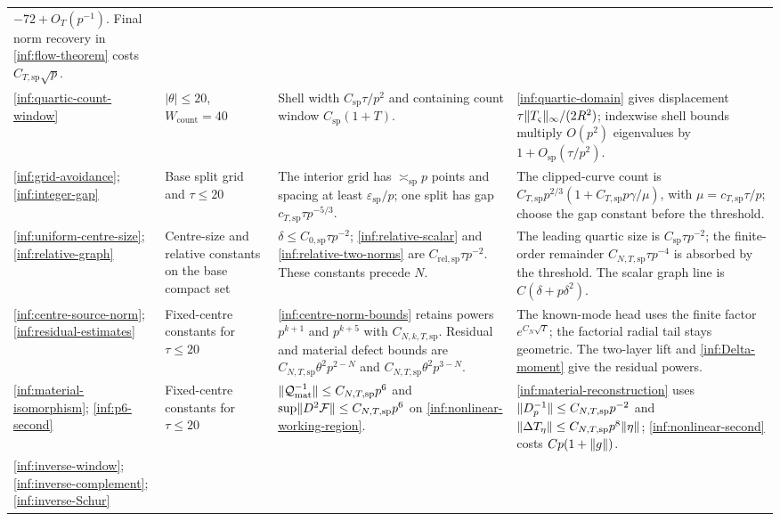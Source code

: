 \begin{lemma}
\begin{longtable}{@{}>{\raggedright\arraybackslash}p{}>{\raggedright\arraybackslash}p{}>{\raggedright\arraybackslash}p{}>{\raggedright\arraybackslash}p{}@{}}
$-72+O_T(p^{-1})$. Final norm recovery in
\ref{inf:flow-theorem} costs $C_{T,\mathrm{sp}}\sqrt p$.\\
\ref{inf:quartic-count-window}
& $|\theta|\le20$, $W_{\mathrm{count}}=40$
& Shell width $C_{\mathrm{sp}}\tau/p^2$ and containing
count window $C_{\mathrm{sp}}(1+T)$.
& \eqref{inf:quartic-domain} gives displacement
$\tau\lVert T_\varsigma\rVert_\infty/(2R^2)$;
indexwise shell bounds multiply $O(p^2)$ eigenvalues by
$1+O_{\mathrm{sp}}(\tau/p^2)$.\\
\ref{inf:grid-avoidance};
\ref{inf:integer-gap}
& Base split grid and $\tau\le20$
& The interior grid has $\asymp_{\mathrm{sp}}p$ points and spacing
at least $\varepsilon_{\mathrm{sp}}/p$; one split has gap
$c_{T,\mathrm{sp}}\tau p^{-5/3}$.
& The clipped-curve count is
$C_{T,\mathrm{sp}}p^{2/3}(1+C_{T,\mathrm{sp}}p\gamma/\mu)$,
with $\mu=c_{T,\mathrm{sp}}\tau/p$;
choose the gap constant before the threshold.\\
\ref{inf:uniform-centre-size};
\ref{inf:relative-graph}
& Centre-size and relative constants on the base compact set
& $\delta\le C_{0,\mathrm{sp}}\tau p^{-2}$;
\eqref{inf:relative-scalar} and \eqref{inf:relative-two-norms}
are $C_{\mathrm{rel},\mathrm{sp}}\tau p^{-2}$.
These constants precede $N$.
& The leading quartic size is $C_{\mathrm{sp}}\tau p^{-2}$;
the finite-order remainder $C_{N,T,\mathrm{sp}}\tau p^{-4}$
is absorbed by the threshold. The scalar graph line is
$C(\delta+p\delta^2)$.\\
\ref{inf:centre-source-norm};
\ref{inf:residual-estimates}
& Fixed-centre constants for $\tau\le20$
& \eqref{inf:centre-norm-bounds} retains powers $p^{k+1}$ and
$p^{k+5}$ with $C_{N,k,T,\mathrm{sp}}$.
Residual and material defect bounds are
$C_{N,T,\mathrm{sp}}\theta^2p^{2-N}$ and
$C_{N,T,\mathrm{sp}}\theta^2p^{3-N}$.
& The known-mode head uses the finite factor $e^{C_N\sqrt T}$;
the factorial radial tail stays geometric. The two-layer lift
and \eqref{inf:Delta-moment} give the residual powers.\\
\ref{inf:material-isomorphism};
\eqref{inf:p6-second}
& Fixed-centre constants for $\tau\le20$
& $\lVert \mathcal Q_{\mathrm{mat}}^{-1}\rVert\le C_{N,T,\mathrm{sp}}p^6$ and
$\sup\lVert D^2\mathcal F\rVert\le C_{N,T,\mathrm{sp}}p^6$
on \eqref{inf:nonlinear-working-region}.
& \eqref{inf:material-reconstruction} uses
$\lVert D_p^{-1}\rVert\le C_{N,T,\mathrm{sp}}p^{-2}$ and
$\lVert \Delta T_\eta\rVert\le C_{N,T,\mathrm{sp}}p^8\lVert \eta\rVert$;
\eqref{inf:nonlinear-second} costs $Cp(1+\lVert g\rVert)$.\\
\eqref{inf:inverse-window};
\ref{inf:inverse-complement};
\ref{inf:inverse-Schur}

\end{longtable}
\end{lemma}
